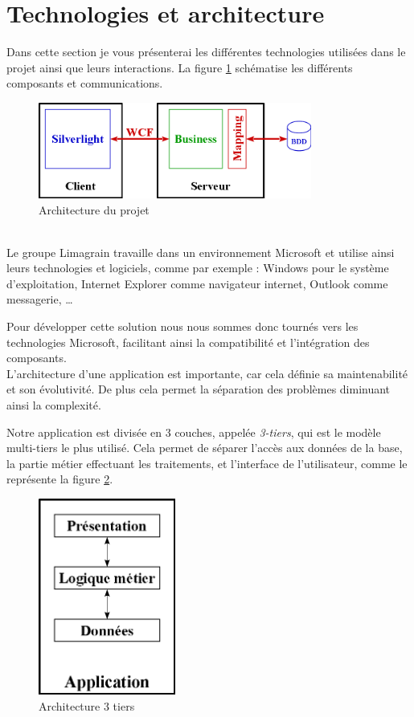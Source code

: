 \section{Technologies et architecture}

Dans cette section je vous présenterai les différentes technologies utilisées dans le projet ainsi que leurs interactions.
La figure \ref{architecture} schématise les différents composants et communications.
\begin{figure}[!h]
	\center
	\includegraphics[width=0.8\textwidth]{img/architecture.png}
	\caption{Architecture du projet}
	\label{architecture}
\end{figure}
~~\\

Le groupe Limagrain travaille dans un environnement Microsoft et utilise ainsi leurs technologies et logiciels, comme par exemple : Windows pour le système d'exploitation, Internet Explorer comme navigateur internet, Outlook comme messagerie, \ldots

Pour développer cette solution nous nous sommes donc tournés vers les technologies Microsoft, facilitant ainsi la compatibilité et l'intégration des composants.
\\

L'architecture d'une application est importante, car cela définie sa maintenabilité et son évolutivité.
De plus cela permet la séparation des problèmes diminuant ainsi la complexité.

Notre application est divisée en 3 couches, appelée \textit{3-tiers}, qui est le modèle multi-tiers le plus utilisé.
Cela permet de séparer l'accès aux données de la base, la partie métier effectuant les traitements, et l'interface de l'utilisateur, comme le représente la figure \ref{architecture_3_tiers}.
\begin{figure}[!h]
	\center
	\includegraphics[width=0.4\textwidth]{img/architecture_3_tiers.png}
	\caption{Architecture 3 tiers}
	\label{architecture_3_tiers}
\end{figure}

